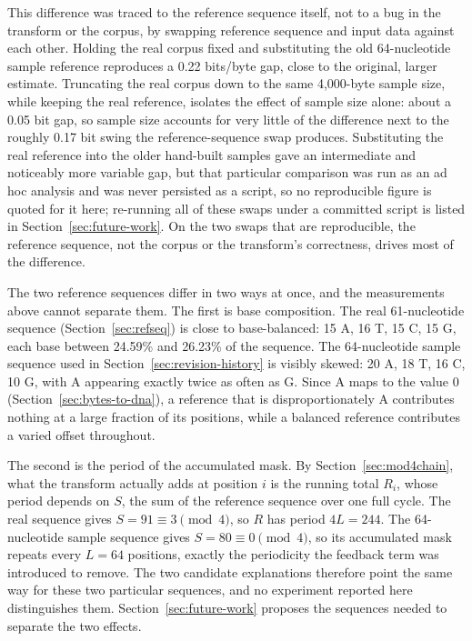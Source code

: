 \documentclass[12pt,a4paper,twoside]{report}
\numberwithin{equation}{chapter}
\begin{document}
This difference was traced to the reference sequence itself, not to a
bug in the transform or the corpus, by swapping reference sequence and
input data against each other. Holding the real corpus fixed and
substituting the old 64-nucleotide sample reference reproduces a 0.22
bits/byte gap, close to the original, larger estimate. Truncating the
real corpus down to the same 4,000-byte sample size, while keeping the
real reference, isolates the effect of sample size alone: about a 0.05
bit gap, so sample size accounts for very little of the difference next
to the roughly 0.17 bit swing the reference-sequence swap produces.
Substituting the real reference into the older hand-built samples gave
an intermediate and noticeably more variable gap, but that particular
comparison was run as an ad hoc analysis and was never persisted as a
script, so no reproducible figure is quoted for it here; re-running all
of these swaps under a committed script is listed in
Section~\ref{sec:future-work}. On the two swaps that are reproducible,
the reference sequence, not the corpus or the transform's correctness,
drives most of the difference.

The two reference sequences differ in two ways at once, and the
measurements above cannot separate them. The first is base composition.
The real 61-nucleotide sequence (Section~\ref{sec:refseq}) is close to
base-balanced: 15 A, 16 T, 15 C, 15 G, each base between 24.59\% and
26.23\% of the sequence. The 64-nucleotide sample sequence used in
Section~\ref{sec:revision-history} is visibly skewed: 20 A, 18 T, 16 C,
10 G, with A appearing exactly twice as often as G. Since A maps to the
value 0 (Section~\ref{sec:bytes-to-dna}), a reference that is
disproportionately A contributes nothing at a large fraction of its
positions, while a balanced reference contributes a varied offset
throughout.

The second is the period of the accumulated mask. By
Section~\ref{sec:mod4chain}, what the transform actually adds at
position $i$ is the running total $R_i$, whose period depends on
$S$, the sum of the reference sequence over one full cycle. The real
sequence gives $S = 91 \equiv 3 \pmod 4$, so $R$ has period
$4L = 244$. The 64-nucleotide sample sequence gives
$S = 80 \equiv 0 \pmod 4$, so its accumulated mask repeats every
$L = 64$ positions, exactly the periodicity the feedback term was
introduced to remove. The two candidate explanations therefore point
the same way for these two particular sequences, and no experiment
reported here distinguishes them. Section~\ref{sec:future-work}
proposes the sequences needed to separate the two effects.
\end{document}
